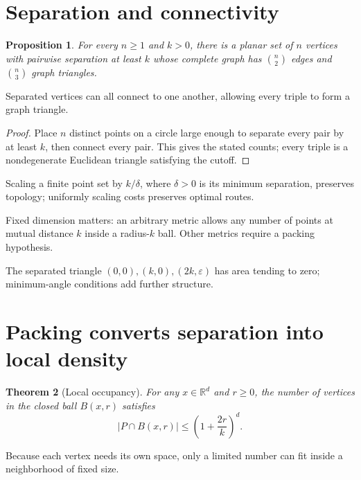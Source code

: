 \documentclass[11pt]{article}
\newtheorem{theorem}{Theorem}
\newtheorem{proposition}[theorem]{Proposition}
\newcommand{\R}{\mathbb R}
\begin{document}
\section{Separation and connectivity}
\begin{proposition}\label{prop:alone}
For every $n\ge1$ and $k>0$, there is a planar set of $n$ vertices with
pairwise separation at least $k$ whose complete graph has $\binom n2$
edges and $\binom n3$ graph triangles.
\end{proposition}
\begin{takeaway}
Separated vertices can all connect to one another, allowing every triple
to form a graph triangle.
\end{takeaway}

\begin{proof}
Place $n$ distinct points on a circle large enough to separate every pair
by at least $k$, then connect every pair. This gives the stated counts;
every triple is a nondegenerate Euclidean triangle satisfying the cutoff.
\end{proof}

Scaling a finite point set by $k/\delta$, where $\delta>0$ is its minimum
separation, preserves topology; uniformly scaling costs preserves optimal routes.

Fixed dimension matters: an arbitrary metric allows any number of points
at mutual distance $k$ inside a radius-$k$ ball. Other metrics require
a packing hypothesis.

The separated triangle $(0,0),(k,0),(2k,\varepsilon)$ has area tending to
zero; minimum-angle conditions add further structure.

\section{Packing converts separation into local density}
\begin{theorem}[Local occupancy]\label{thm:packing}
For any $x\in\R^d$ and $r\ge0$, the number of vertices in the closed ball
$B(x,r)$ satisfies
\begin{equation}\label{eq:occupancy}
 |P\cap B(x,r)|\le \left(1+\frac{2r}{k}\right)^d.
\end{equation}
\end{theorem}
\begin{takeaway}
Because each vertex needs its own space, only a limited number can fit
inside a neighborhood of fixed size.
\end{takeaway}
\end{document}
